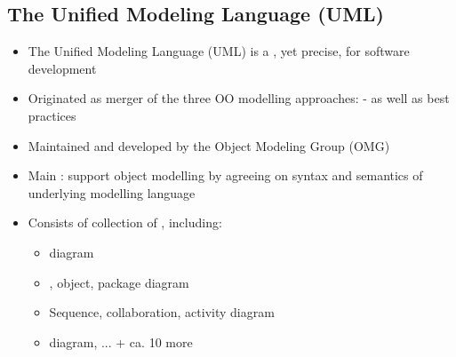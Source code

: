 \subsection{The Unified Modeling Language (UML)}
\begin{defBox}[title=Some Facts]
    \begin{itemize}
        \item The Unified Modeling Language (UML) is a , yet precise,  for software development
        \item Originated as merger of the three OO modelling approaches: - as well as best practices
        \item Maintained and developed by the Object Modeling Group (OMG)
        \item Main : support object modelling  by agreeing on syntax and semantics of underlying modelling language
        \item Consists of collection of , including:
        \begin{itemize}
            \item {} diagram
            \item {}, object, package diagram
            \item Sequence, collaboration, activity diagram
            \item {} diagram, ... + ca. 10 more
        \end{itemize}
    \end{itemize}
\end{defBox}
